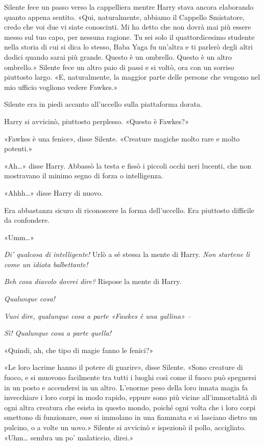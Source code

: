 Silente fece un passo verso la cappelliera mentre Harry stava ancora elaborando quanto appena sentito. «Qui, naturalmente, abbiamo il Cappello Smistatore, credo che voi due vi siate conosciuti. Mi ha detto che non dovrà mai più essere messo sul tuo capo, per nessuna ragione. Tu sei solo il quattordicesimo studente nella storia di cui si dica lo stesso, Baba Yaga fu un’altra e ti parlerò degli altri dodici quando sarai più grande. Questo è un ombrello. Questo è un altro ombrello.» Silente fece un altro paio di passi e si voltò, ora con un sorriso piuttosto largo. «E, naturalmente, la maggior parte delle persone che vengono nel mio ufficio vogliono vedere Fawkes.»

Silente era in piedi accanto all’uccello sulla piattaforma dorata.

Harry si avvicinò, piuttosto perplesso. «Questo è Fawkes?»

«Fawkes è una fenice», disse Silente. «Creature magiche molto rare e molto potenti.»

«Ah…» disse Harry. Abbassò la testa e fissò i piccoli occhi neri lucenti, che non mostravano il minimo segno di forza o intelligenza.

«Ahhh…» disse Harry di nuovo.

Era abbastanza sicuro di riconoscere la forma dell’uccello. Era piuttosto difficile da confondere.

«Umm…»

\textit{Di’ qualcosa di intelligente!} Urlò a sé stessa la mente di Harry. \textit{Non startene lì come un idiota balbettante!}

\textit{Beh cosa diavolo dovrei dire?} Rispose la mente di Harry.

\textit{Qualunque cosa!}

\textit{Vuoi dire, qualunque cosa a parte «Fawkes è una gallina» –}

\textit{Sì! Qualunque cosa a parte quella!}

«Quindi, ah, che tipo di magie fanno le fenici?»

«Le loro lacrime hanno il potere di guarire», disse Silente. «Sono creature di fuoco, e si muovono facilmente tra tutti i luoghi così come il fuoco può spegnersi in un posto e accendersi in un altro. L’enorme peso della loro innata magia fa invecchiare i loro corpi in modo rapido, eppure sono più vicine all’immortalità di ogni altra creatura che esista in questo mondo, poiché ogni volta che i loro corpi smettono di funzionare, esse si immolano in una fiammata e si lasciano dietro un pulcino, o a volte un uovo.» Silente si avvicinò e ispezionò il pollo, accigliato. «Uhm… sembra un po’ malaticcio, direi.»

